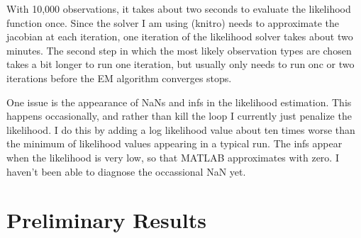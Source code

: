 \documentclass{article}
\begin{document}
With 10,000 observations, it takes about two seconds to evaluate the likelihood function once.
Since the solver I am using (knitro) needs to approximate the jacobian at each iteration, one iteration of the likelihood solver takes about two minutes.
The second step in which the most likely observation types are chosen takes a bit longer to run one iteration, but usually only needs to run onc or two iterations before the EM algorithm converges stops.

One issue is the appearance of NaNs and infs in the likelihood estimation. 
This happens occasionally, and rather than kill the loop I currently just penalize the likelihood.
I do this by adding a log likelihood value about ten times worse than the minimum of likelihood values appearing in a typical run.
The infs appear when the likelihood is very low, so that MATLAB approximates with zero.
I haven't been able to diagnose the occassional NaN yet.

\section{Preliminary Results}
\end{document}
